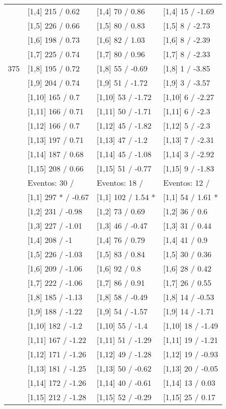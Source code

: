 \begin{table}
\begin{tabular}[t]{llll}
\addlinespace
 & {}[1,4] 215  / 0.62 & {}[1,4] 70  / 0.86 & {}[1,4] 15  / -1.69\\
 & {}[1,5] 226  / 0.66 & {}[1,5] 80  / 0.83 & {}[1,5] 8  / -2.73\\
 & {}[1,6] 198  / 0.73 & {}[1,6] 82  / 1.03 & {}[1,6] 8  / -2.39\\
 & {}[1,7] 225  / 0.74 & {}[1,7] 80  / 0.96 & {}[1,7] 8  / -2.33\\
375 & {}[1,8] 195  / 0.72 & {}[1,8] 55  / -0.69 & {}[1,8] 1  / -3.85\\
\addlinespace
 & {}[1,9] 204  / 0.74 & {}[1,9] 51  / -1.72 & {}[1,9] 3  / -3.57\\
 & {}[1,10] 165  / 0.7 & {}[1,10] 53  / -1.72 & {}[1,10] 6  / -2.27\\
 & {}[1,11] 166  / 0.71 & {}[1,11] 50  / -1.71 & {}[1,11] 6  / -2.3\\
 & {}[1,12] 166  / 0.7 & {}[1,12] 45  / -1.82 & {}[1,12] 5  / -2.3\\
 & {}[1,13] 197  / 0.71 & {}[1,13] 47  / -1.2 & {}[1,13] 7  / -2.31\\
\addlinespace
 & {}[1,14] 187  / 0.68 & {}[1,14] 45  / -1.08 & {}[1,14] 3  / -2.92\\
 & {}[1,15] 208  / 0.66 & {}[1,15] 51  / -0.77 & {}[1,15] 9  / -1.83\\
 & Eventos:  30 / & Eventos:  18 / & Eventos:  12 /\\
 & {}[1,1] 297 * / -0.67 & {}[1,1] 102  / 1.54 * & {}[1,1] 54  / 1.61 *\\
 & {}[1,2] 231  / -0.98 & {}[1,2] 73  / 0.69 & {}[1,2] 36  / 0.6\\
\addlinespace
 & {}[1,3] 227  / -1.01 & {}[1,3] 46  / -0.47 & {}[1,3] 31  / 0.44\\
 & {}[1,4] 208  / -1 & {}[1,4] 76  / 0.79 & {}[1,4] 41  / 0.9\\
 & {}[1,5] 226  / -1.03 & {}[1,5] 83  / 0.84 & {}[1,5] 30  / 0.36\\
 & {}[1,6] 209  / -1.06 & {}[1,6] 92  / 0.8 & {}[1,6] 28  / 0.42\\
 & {}[1,7] 222  / -1.06 & {}[1,7] 86  / 0.91 & {}[1,7] 26  / 0.55\\
\addlinespace
500 & {}[1,8] 185  / -1.13 & {}[1,8] 58  / -0.49 & {}[1,8] 14  / -0.53\\
 & {}[1,9] 188  / -1.22 & {}[1,9] 54  / -1.57 & {}[1,9] 14  / -1.71\\
 & {}[1,10] 182  / -1.2 & {}[1,10] 55  / -1.4 & {}[1,10] 18  / -1.49\\
 & {}[1,11] 167  / -1.22 & {}[1,11] 51  / -1.29 & {}[1,11] 19  / -1.21\\
 & {}[1,12] 171  / -1.26 & {}[1,12] 49  / -1.28 & {}[1,12] 19  / -0.93\\
\addlinespace
 & {}[1,13] 181  / -1.25 & {}[1,13] 50  / -0.62 & {}[1,13] 20  / -0.05\\
 & {}[1,14] 172  / -1.26 & {}[1,14] 40  / -0.61 & {}[1,14] 13  / 0.03\\
 & {}[1,15] 212  / -1.28 & {}[1,15] 52  / -0.29 & {}[1,15] 25  / 0.17\\
\bottomrule
\end{tabular}
\end{table}
